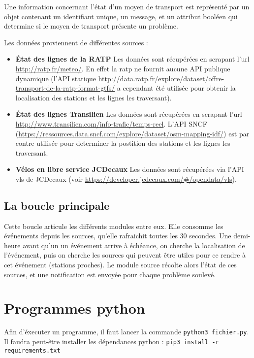 \documentclass[a4paper, 8pt]{article}
\begin{document}
Une information concernant l'état d'un moyen de transport est représenté par un
objet contenant un identifiant unique, un message, et un attribut booléen qui
determine si le moyen de transport présente un problème.

Les données proviennent de différentes sources :
\begin{itemize}
  \item \textbf{État des lignes de la RATP} Les données sont récupérées en scrapant l'url
  \url{http://ratp.fr/meteo/}.
  En effet la ratp ne fournit aucune API publique dynamique (l'API statique
  \url{http://data.ratp.fr/explore/dataset/offre-transport-de-la-ratp-format-gtfs/}
  a
  cependant été utilisée pour obtenir la localisation des stations et les lignes
  les traversant).

  \item \textbf{État des lignes Transilien} Les données sont récupérées en scrapant l'url \url{http://www.transilien.com/info-trafic/temps-reel}.
  L'API SNCF (\url{https://ressources.data.sncf.com/explore/dataset/osm-mapping-idf/})
  est par contre utilisée pour determiner la postition des stations et les
  lignes les traversant.

  \item \textbf{Vélos en libre service JCDecaux} Les données sont récupérées via
  l'API vls de JCDecaux (voir \url{https://developer.jcdecaux.com/#/opendata/vls}).
\end{itemize}

\subsection{La boucle principale}

Cette boucle articule les différents modules entre eux.
Elle consomme les événements depuis les sources, qu'elle rafraichit toutes les
$30$ secondes.
Une demi-heure avant qu'un un événement arrive à échéance, on cherche la
localisation de l'événement, puis on cherche les sources qui peuvent être utiles
pour ce rendre à cet événement (stations proches).
Le module source récolte alors l'état de ces sources, et une notification est
envoyée pour chaque problème soulevé.


\section{Programmes python}

Afin d'éxecuter un programme, il faut lancer la commande
\texttt{python3 fichier.py}.
Il faudra peut-être installer les dépendances python :
\texttt{pip3 install -r requirements.txt}
\end{document}
